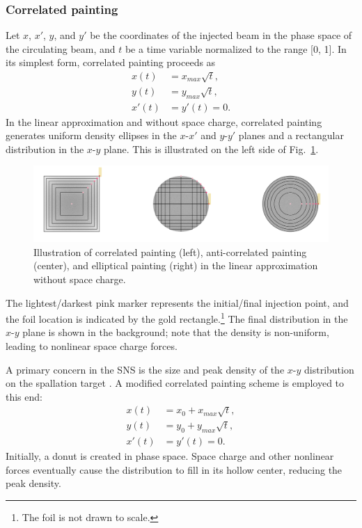 \subsubsection{Correlated painting}

Let $x$, $x'$, $y$, and $y'$ be the coordinates of the injected beam in the phase space of the circulating beam, and $t$ be a time variable normalized to the range [0, 1]. In its simplest form, correlated painting proceeds as
%
\begin{equation}
\begin{aligned}
    {x}(t) &= {x}_{max}\sqrt{t}, \\
    {y}(t) &= {y}_{max}\sqrt{t}, \\
    x'(t) &= y'(t) = 0.
\end{aligned}
\end{equation}
%
In the linear approximation and without space charge, correlated painting generates uniform density ellipses in the $x$-$x'$ and $y$-$y'$ planes and a rectangular distribution in the $x$-$y$ plane. This is illustrated on the left side of Fig.~\ref{fig:painting_graphic}. 
%
\begin{figure}[!p]
    \centering
    \includegraphics[width=\textwidth]{Images/chapter1/painting_graphic.png}
    \caption{Illustration of correlated painting (left), anti-correlated painting (center), and elliptical painting (right) in the linear approximation without space charge.}
    \label{fig:painting_graphic}
\end{figure}
%
The lightest/darkest pink marker represents the initial/final injection point, and the foil location is indicated by the gold rectangle.\footnote{The foil is not drawn to scale.} The final distribution in the $x$-$y$ plane is shown in the background; note that the density is non-uniform, leading to nonlinear space charge forces. 

A primary concern in the SNS is the size and peak density of the $x$-$y$ distribution on the spallation target \cite{Riemer2010}. A modified correlated painting scheme is employed to this end:
%
\begin{equation}
\begin{aligned}
    {x}(t) &= x_0 + x_{max}\sqrt{t}, \\
    {y}(t) &= y_0 + y_{max}\sqrt{t}, \\
    x'(t) &= y'(t) = 0.
\end{aligned}
\end{equation}
%
Initially, a donut is created in phase space. Space charge and other nonlinear forces eventually cause the distribution to fill in its hollow center, reducing the peak density.



